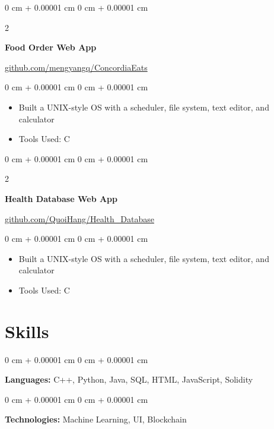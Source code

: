 \documentclass[10pt, letterpaper]{article}
\newenvironment{highlights}{
    \begin{itemize}[
        topsep=0.10 cm,
        parsep=0.10 cm,
        partopsep=0pt,
        itemsep=0pt,
        leftmargin=0 cm + 10pt
    ]
}{
    \end{itemize}
} %
\newenvironment{onecolentry}{
    \begin{adjustwidth}{
        0 cm + 0.00001 cm
    }{
        0 cm + 0.00001 cm
    }
}{
    \end{adjustwidth}
} %
\newenvironment{twocolentry}[2][]{
    \onecolentry
    \def\secondColumn{#2}
    \setcolumnwidth{\fill, 6.5 cm}
    \begin{paracol}{2}
}{
    \switchcolumn \raggedleft \secondColumn
    \end{paracol}
    \endonecolentry
} %
\begin{document}
        \vspace{0.2 cm}

        \begin{twocolentry}{
            \href{https://github.com/mengyangq/ConcordiaEats}{github.com/mengyangq/ConcordiaEats}
        }
            \textbf{Food Order Web App}
        \end{twocolentry}

        \vspace{0.10 cm}
        \begin{onecolentry}
            \begin{highlights}
                \item Built a UNIX-style OS with a scheduler, file system, text editor, and calculator
                \item Tools Used: C
            \end{highlights}
        \end{onecolentry}


        \vspace{0.2 cm}

        \begin{twocolentry}{
            \href{https://github.com/QuoiHang/Health_Database}{github.com/QuoiHang/Health\_Database}
        }
            \textbf{Health Database Web App}
        \end{twocolentry}


        \vspace{0.10 cm}
        \begin{onecolentry}
            \begin{highlights}
                \item Built a UNIX-style OS with a scheduler, file system, text editor, and calculator
                \item Tools Used: C
            \end{highlights}
        \end{onecolentry}

    
    \section{Skills}
        \begin{onecolentry}
            \textbf{Languages:} C++, Python, Java, SQL, HTML, JavaScript, Solidity
        \end{onecolentry}

        \vspace{0.2 cm}

        \begin{onecolentry}
            \textbf{Technologies:} Machine Learning, UI, Blockchain
        \end{onecolentry}
\end{document}
